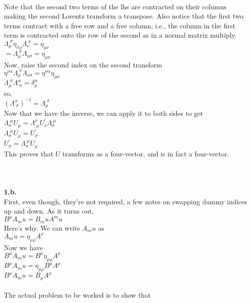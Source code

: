 \documentclass[prb,preprint]
{revtex4-1}
\newcommand{\PRLsep}{\noindent\makebox[\linewidth]{\resizebox{0.8888\linewidth}{2pt}{$\bullet$}}\bigskip}
\begin{document}
\\
Note that the second two terms of the lhs are contracted on their columns making the second Lorentz transform a transpose.  Also notice that the first two terms contract with a free row and a free column, i.e., the column in the first term is contracted onto the row of the second as in a normal matrix multiply.
\\
$\Lambda_\mu^{\;\sigma} \eta_{\sigma \rho} \Lambda_\nu^{\;\rho} = \eta_{\mu\nu}$
\\
$  = \Lambda_\mu^{\;\sigma} \Lambda_{\nu\sigma} = \eta_{\mu\nu}$
\\
Now, raise the second index on the second transform
\\
$\eta^{\nu\alpha} \Lambda_\mu^{\;\sigma} \Lambda_{\nu\sigma} = \eta^{\nu\alpha} \eta_{\mu\nu}$
\\
$\Lambda_\mu^{\;\sigma} \Lambda^\alpha_{\;\sigma} = \delta^\alpha_\mu$
\\
so,
\\
$\left(\Lambda^\alpha_{\;\sigma}\right)^{-1} = \Lambda_\mu^{\;\sigma}$
\\
Now that we have the inverse, we can apply it to both sides to get
\\
$\Lambda_\sigma^{\;\mu} U_\mu = \Lambda^\nu_{\;\mu} U^\prime_\nu \Lambda_\sigma^{\;\mu} $
\\
$\Lambda_\sigma^{\;\mu} U_\mu = U^\prime_\sigma$
\\
$U^\prime_\sigma = \Lambda_\sigma^{\;\mu} U_\mu$
\\
This proves that $U$ transforms as a four-vector, and is in fact a four-vector.
\\
\\
\PRLsep
\\
\\
\textbf{1.b.}
\\
First, even though, they're not required, a few notes on swapping dummy indices up and down.  As it turns out,
\\
$B^\mu A_mu = B_mu A^mu$
\\
Here's why.  We can write $A_mu$ as
\\
$A_mu = \eta_{\mu\rho}A^\rho$
\\
Now we have
\\
$B^\mu A_mu = B^\mu \eta_{\mu\rho} A^\rho$
\\
$B^\mu A_mu = \eta_{\mu\rho} B^\mu A^\rho$
\\
$B^\mu A_mu = B_\mu A^\rho$
\\
\\
The actual problem to be worked is to show that
\end{document}
